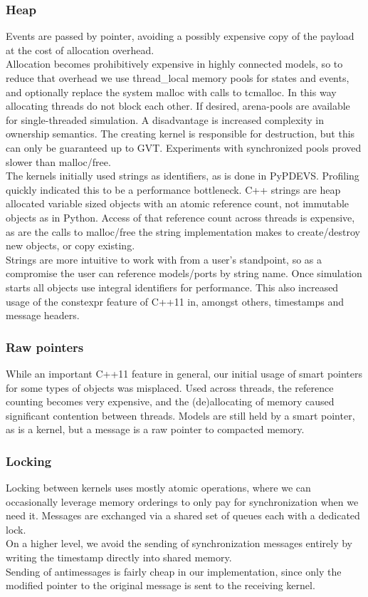 \subsubsection{Heap}
Events are passed by pointer, avoiding a possibly expensive copy of the payload at the cost of allocation overhead.\\
Allocation becomes prohibitively expensive in highly connected models, so to reduce that overhead we use thread\_local memory pools for states and events, and optionally replace the system malloc with calls to tcmalloc\cite{tcmalloc}. In this way allocating threads do not block each other. If desired, arena-pools are available for single-threaded simulation. A disadvantage is increased complexity in ownership semantics. The creating kernel is responsible for destruction, but this can only be guaranteed up to GVT. Experiments with synchronized pools proved slower than malloc/free. \\
The kernels initially used strings as identifiers, as is done in PyPDEVS. Profiling quickly indicated this to be a performance bottleneck. C++ strings are heap allocated variable sized objects with an atomic reference count, not immutable objects as in Python. Access of that reference count across threads is expensive, as are the calls to malloc/free the string implementation makes to create/destroy new objects, or copy existing.\\
Strings are more intuitive to work with from a user's standpoint, so as a compromise the user can reference models/ports by string name. Once simulation starts all objects use integral identifiers for performance. This also increased usage of the constexpr feature of C++11 in, amongst others, timestamps and message headers.
\subsubsection{Raw pointers}
While an important C++11 feature in general, our initial usage of smart pointers for some types of objects was misplaced. Used across threads, the reference counting becomes very expensive, and the (de)allocating of memory caused significant contention between threads. Models are still held by a smart pointer, as is a kernel, but a message is a raw pointer to compacted memory. 
\subsubsection{Locking}
Locking between kernels uses mostly atomic operations, where we can occasionally leverage memory orderings to only pay for synchronization when we need it. Messages are exchanged via a shared set of queues each with a dedicated lock.\\
On a higher level, we avoid the sending of synchronization messages entirely by writing the timestamp directly into shared memory.\\ Sending of antimessages is fairly cheap in our implementation, since only the modified pointer to the original message is sent to the receiving kernel.
